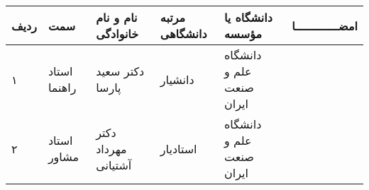 \begin{center}
\begin{tabular}{| p{8mm} | p{18mm} | p{} |p{14mm}|p{}|c|}
\hline
ردیف	& سمت & نام و نام خانوادگی & مرتبه \newline دانشگاهی &	دانشگاه یا مؤسسه &	امضـــــــــــــا\\
\hline
۱  &	استاد راهنما				 & دکتر \newline سعید پارسا & دانشیار & دانشگاه \newline علم و صنعت ایران &  \\
\hline
۲ &     استاد مشاور				 & دکتر \newline مهرداد آشتیانی & استادیار & دانشگاه \newline علم و صنعت ایران & \\
\hline
\hline
\end{tabular}
\end{center}

